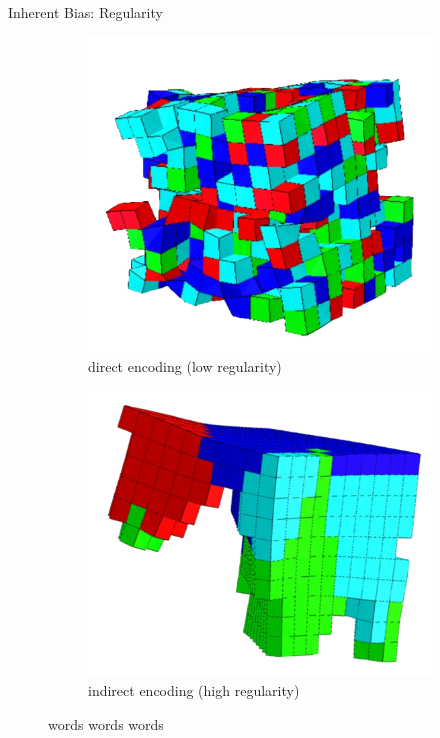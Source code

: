 \begin{frame}{Inherent Bias: Regularity}
\begin{figure}
  \centering
  \begin{subfigure}[b]{0.5\textwidth}
    \centering
    \includegraphics[width=\textwidth]{img/direct_encoding.png}
    \caption{direct encoding (low regularity)}
    \label{subfig:canalization}
  \end{subfigure}%
  \hfill
  \begin{subfigure}[b]{0.5\textwidth}
    \centering
    \includegraphics[width=\textwidth]{img/cppn-neat_encoded.png}
    \caption{indirect encoding (high regularity)}
  \end{subfigure}
  \captionsetup{singlelinecheck=off,justification=raggedright}
  \caption{words words words \cite{Cheney2013UnshacklingEncoding}}
\end{figure}
\end{frame}


